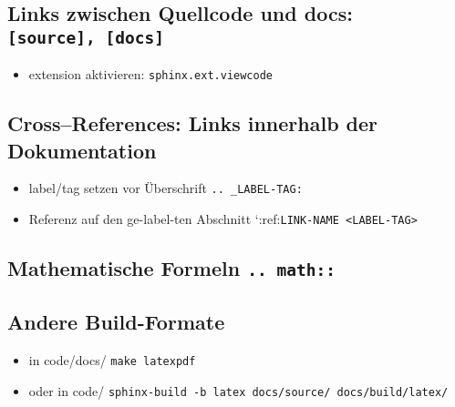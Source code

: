 \hypertarget{links-zwischen-quellcode-und-docs-source-docs}{%
\subsection{\texorpdfstring{Links zwischen Quellcode und docs:
\texttt{{[}source{]},\ {[}docs{]}}}{Links zwischen Quellcode und docs: {[}source{]}, {[}docs{]}}}\label{links-zwischen-quellcode-und-docs-source-docs}}

\begin{itemize}
\tightlist
\item
  extension aktivieren: \texttt{sphinx.ext.viewcode}
\end{itemize}

\hypertarget{crossreferences-links-innerhalb-der-dokumentation}{%
\subsection{\texorpdfstring{\textbf{Cross--References: Links innerhalb
der
Dokumentation}}{Cross--References: Links innerhalb der Dokumentation}}\label{crossreferences-links-innerhalb-der-dokumentation}}

\begin{itemize}
\tightlist
\item
  label/tag setzen vor Überschrift \texttt{..\ \_LABEL-TAG:}
\item
  Referenz auf den ge-label-ten Abschnitt
  `:ref:\texttt{LINK-NAME\ \textless{}LABEL-TAG\textgreater{}}
\end{itemize}

\hypertarget{mathematische-formeln-..-math}{%
\subsection{\texorpdfstring{\textbf{Mathematische Formeln}
\texttt{..\ math::}}{Mathematische Formeln .. math::}}\label{mathematische-formeln-..-math}}

\hypertarget{andere-build-formate}{%
\subsection{\texorpdfstring{\textbf{Andere
Build-Formate}}{Andere Build-Formate}}\label{andere-build-formate}}

\begin{itemize}
\item
  in code/docs/ \texttt{make\ latexpdf}
\item
  oder in code/
  \texttt{sphinx-build\ -b\ latex\ docs/source/\ docs/build/latex/}
\end{itemize}
